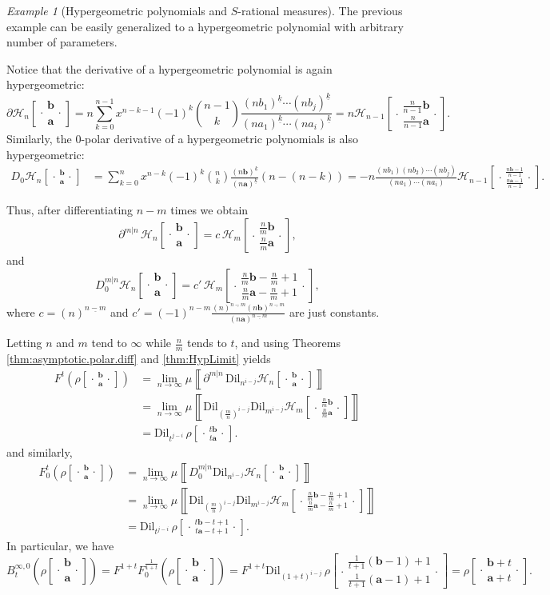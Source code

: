 \documentclass[reqno,11pt]{amsart}
\theoremstyle{remark}
\newtheorem{example}[theorem]{Example}
\newcommand{\dil}[1]{\mbox{Dil}_{#1}}
\newcommand{\diff}[2]{\partial^{#1|#2}\, }  %
\newcommand{\falling}[2]{\left(#1\right)^{\underline{#2}}}
\newcommand*\HGP[3]{%
 \mathcal{H}_{#1}{\left[\genfrac..{0pt}{1}{#2}{#3}\right]}%
}
\newcommand*\SRM[2]{%
 \rho{\left[\genfrac..{0pt}{1}{#1}{#2}\right]}%
}
\newcommand{\polar}[1]{D_{#1}}
\newcommand{\polars}[3]{D_{#1}^{#2|#3}}
\newcommand{\freepower}[1]{F^{#1}}
\newcommand{\pfreepower}[2]{F_{#1}^{#2}}
\newcommand{\meas}[1]{\mu \left\llbracket #1 \right\rrbracket}
\begin{document}
\begin{example}[Hypergeometric polynomials and $S$-rational measures] 
The previous example can be easily generalized to a hypergeometric polynomial with arbitrary number of parameters.

Notice that the derivative of a hypergeometric polynomial is again hypergeometric:
$$ \partial \HGP{n}{\bm b}{\bm a}  =  n\sum_{k=0}^{n-1} x^{n-k-1} (-1)^k \binom{n-1}{k} \frac{\falling{nb_1}{k} \cdots \falling{nb_j}{k}}{\falling{na_1}{k}\cdots \falling{na_i}{k}} = n\HGP{n-1}{\tfrac{n}{n-1}\bm b}{\tfrac{n}{n-1}\bm a}.$$
Similarly, the $0$-polar derivative of a hypergeometric polynomials is also hypergeometric:
\begin{align*}
\polar{0}\HGP{n}{\bm b}{\bm a}&=\sum_{k=0}^n x^{n-k} (-1)^k \binom{n}{k} \frac{\falling{n\bm b}{k}}{\falling{n\bm a}{k}} (n-(n-k)) =-n\frac{(nb_1)(nb_2)\cdots(nb_j)}{(na_1)\cdots(na_i)}\HGP{n-1}{\frac{n\bm b-1}{n-1}}{\frac{n\bm a-1}{n-1}}.
\end{align*}


Thus, after differentiating $n-m$ times we obtain
$$ \diff{m}{n}\HGP{n}{\bm b}{\bm a}=c \, \HGP{m}{\frac{n}{m}\bm b}{\frac{n}{m}\bm a}, $$
and
$$\polars{0}{m}{n}\HGP{n}{\bm b}{\bm a}=c' \, \HGP{m}{\frac{n}{m}\bm b-\frac{n}{m}+1}{\frac{n}{m}\bm a-\frac{n}{m}+1},$$ 
where $ c= \falling{n}{n-m}$ and $c'=(-1)^{n-m}\frac{ \falling{n}{n-m}\falling{n\bm b}{n-m}}{\falling{n\bm a}{n-m}}$ are just constants.



Letting $n$ and $m$ tend to $\infty$ while $\frac{n}{m}$ tends to $t$, and using Theorems \ref{thm:asymptotic.polar.diff} and  \ref{thm:HypLimit}  yields
\begin{align*}
\freepower{t}\left( \SRM{\bm b}{\bm a} \right) &= \lim_{n\to\infty}\meas{\diff{m}{n} \dil{n^{i-j}} \HGP{n}{\bm b}{\bm a} }\\
&= \lim_{n\to\infty} \meas{ \dil{(\frac{m}{n})^{i-j}} \dil{m^{i-j}}  \HGP{m}{\frac{n}{m}\bm b}{\frac{n}{m}\bm a} }\\
&= \dil{t^{j-i}}\,  \SRM{t\bm b}{t\bm a}.
\end{align*}
and similarly,
\begin{align*}
\pfreepower{0}{t}\left( \SRM{\bm b}{\bm a} \right) &= \lim_{n\to\infty}\meas{\polars{0}{m}{n} \dil{n^{i-j}} \HGP{n}{\bm b}{\bm a} }\\
&= \lim_{n\to\infty} \meas{ \dil{(\frac{m}{n})^{i-j}} \dil{m^{i-j}}  \HGP{m}{\frac{n}{m}\bm b-\frac{n}{m}+1}{\frac{n}{m}\bm a-\frac{n}{m}+1} }\\
&= \dil{t^{j-i}}\,  \SRM{t\bm b-t+1}{t\bm a-t+1}.
\end{align*}
In particular, we have
$$ B_t^{\infty,0}\left( \SRM{\bm b}{\bm a} \right) =   \freepower{1+t}\pfreepower{0}{\tfrac{1}{1+t}}\left( \SRM{\bm b}{\bm a} \right) = \freepower{1+t}\dil{{(1+t)}^{i-j}}\,\SRM{\frac{1}{t+1}(\bm b-1)+1}{\frac{1}{t+1}(\bm a-1)+1} =  \SRM{\bm b+t}{\bm a+t}. $$


\end{example}
\end{document}
